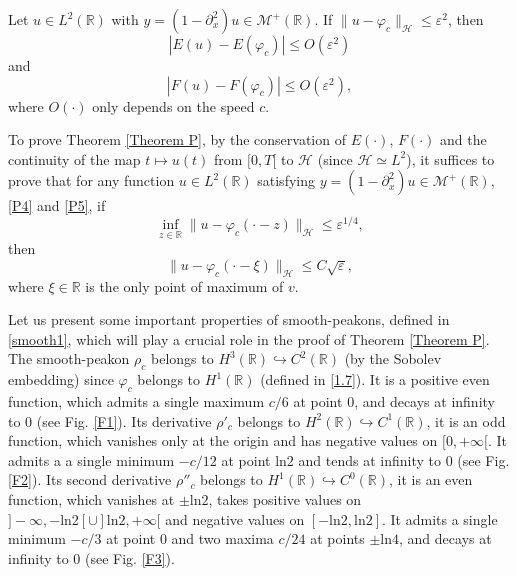 \documentclass[10pt,a4paper,twoside]{article}
\begin{document}
\begin{Lem}\label{Lemma P1}
Let $u\in L^{2}(\mathbb{R})$ with $y=(1-\partial^{2}_{x})u\in\mathcal{M}^{+}(\mathbb{R})$. 
If $\|u-\varphi_{c}\|_{\mathcal{H}}\le\varepsilon^2 $, then
\begin{equation}
|E(u)-E(\varphi_{c})|\le O(\varepsilon^2)
\label{P4}
\end{equation}
and 
\begin{equation}
|F(u)-F(\varphi_{c})|\le O(\varepsilon^2),
\label{P5}
\end{equation}
where $O(\cdot)$ only depends on the speed $c$.
\end{Lem}
To prove Theorem \ref{Theorem P}, by the conservation of $E(\cdot)$, $F(\cdot)$ and the continuity of the map $t\mapsto u(t)$ from $[0,T[$ to $\mathcal{H}$ (since $\mathcal{H}\simeq L^{2}$), it suffices to prove that for any function $u\in L^{2}(\mathbb{R})$ satisfying $y=(1-\partial^{2}_{x})u\in\mathcal{M}^{+}(\mathbb{R})$, \eqref{P4} and \eqref{P5}, if 
\begin{equation}
\inf_{z\in\mathbb{R}}\|u-\varphi_{c}(\cdot-z)\|_{\mathcal{H}}\le\varepsilon^{1/4},
\label{P6}
\end{equation}
then 
\begin{equation}
\|u-\varphi_{c}(\cdot-\xi)\|_{\mathcal{H}}\le C\sqrt{\varepsilon},
\label{P7}
\end{equation}
where $\xi\in\mathbb{R}$ is the only point of maximum of $v$.





Let us present some important properties of smooth-peakons, defined in \eqref{smooth1}, which will play a crucial role in the proof of Theorem \ref{Theorem P}. The smooth-peakon $\rho_{c}$ belongs to $H^{3}(\mathbb{R})\hookrightarrow C^{2}(\mathbb{R})$ (by the Sobolev embedding) since $\varphi_{c}$ belongs to $H^{1}(\mathbb{R})$ (defined in \eqref{1.7}). It is a positive even function, which admits a single maximum $c/6$ at point $0$, and decays at infinity to $0$ (see Fig. \ref{F1}). Its derivative $\rho'_{c}$ belongs to $H^{2}(\mathbb{R})\hookrightarrow C^{1}(\mathbb{R})$, it is an odd function, which vanishes only at the origin and has  negative values on $[0,+\infty[$. It admits a  a single minimum $-c/12$ at point $\text{ln}2$ and tends at infinity to $0$ (see Fig. \ref{F2}). Its second derivative $\rho''_{c}$ belongs to $H^{1}(\mathbb{R})\hookrightarrow 
C^{0}(\mathbb{R})$, it is an even function, which vanishes at $\pm\text{ln}2$, takes positive values on 
$]-\infty,-\text{ln}2[\cup]\text{ln}2,+\infty[$ and negative values on $[-\text{ln}2,\text{ln}2]$. It admits a single minimum $-c/3$ at point $0$ and two maxima $c/24$ at points $\pm\text{ln}4$, and decays at infinity to $0$ (see Fig. \ref{F3}).
\end{document}
